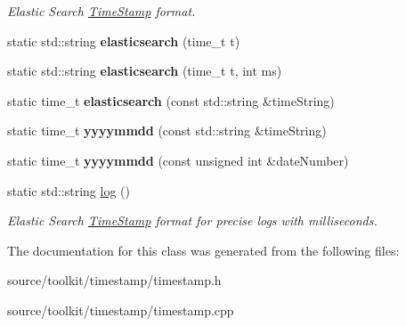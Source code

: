 \begin{DoxyCompactItemize}
\begin{DoxyCompactList}\small\item\em Elastic Search \hyperlink{classTimeStamp}{Time\+Stamp} format. \end{DoxyCompactList}\item 
\mbox{\label{classTimeStamp_ae2df01c11b5a13b5d44a86c1a25f331b}} 
static std\+::string {\bfseries elasticsearch} (time\+\_\+t t)
\item 
\mbox{\label{classTimeStamp_a5e9090412ada8e583b6f7f62b82f05f9}} 
static std\+::string {\bfseries elasticsearch} (time\+\_\+t t, int ms)
\item 
\mbox{\label{classTimeStamp_a7f8fb294f5d207784c82e35ba232bca3}} 
static time\+\_\+t {\bfseries elasticsearch} (const std\+::string \&time\+String)
\item 
\mbox{\label{classTimeStamp_a6657196c0270bdd7600b83562ae0f3e2}} 
static time\+\_\+t {\bfseries yyyymmdd} (const std\+::string \&time\+String)
\item 
\mbox{\label{classTimeStamp_aa83f3124600312f49f4586666782004f}} 
static time\+\_\+t {\bfseries yyyymmdd} (const unsigned int \&date\+Number)
\item 
\mbox{\label{classTimeStamp_a466fb65dded67e0461ba941a473be5b7}} 
static std\+::string \hyperlink{classTimeStamp_a466fb65dded67e0461ba941a473be5b7}{log} ()
\begin{DoxyCompactList}\small\item\em Elastic Search \hyperlink{classTimeStamp}{Time\+Stamp} format for precise logs with milliseconds. \end{DoxyCompactList}\end{DoxyCompactItemize}


The documentation for this class was generated from the following files\+:\begin{DoxyCompactItemize}
\item 
source/toolkit/timestamp/timestamp.\+h\item 
source/toolkit/timestamp/timestamp.\+cpp\end{DoxyCompactItemize}
